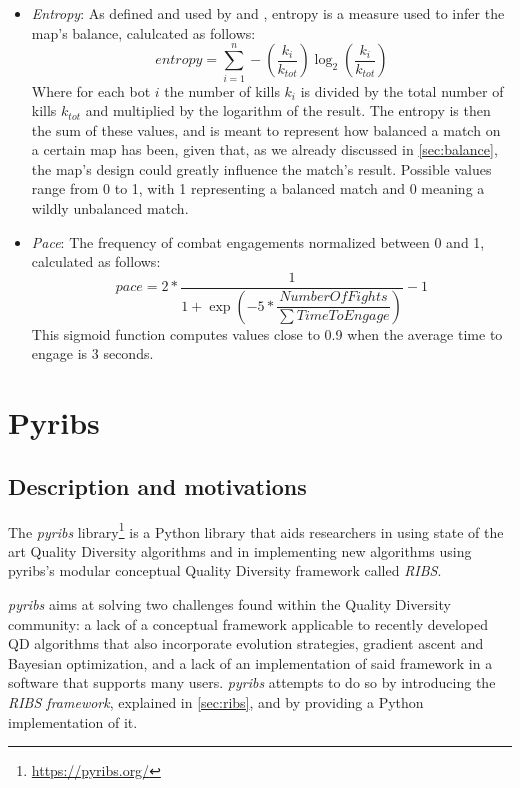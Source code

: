 \documentclass{Configuration_Files/PoliMi3i_thesis}
\begin{document}
\begin{itemize}
    \item \textit{Entropy}: As defined and used by \citet{lanzi_evolving_2014} and \citet{loiacono_fight_2017}, entropy is a measure used to infer the map's balance, calulcated as follows:
    \begin{equation}
        entropy = \sum_{i=1}^{n} - \left(\dfrac{k_i}{k_{tot}}\right) \log_2 \left(\dfrac{k_i}{k_{tot}}\right)
    \end{equation}
    Where for each bot $i$ the number of kills $k_i$ is divided by the total number of kills $k_{tot}$ and multiplied by the logarithm of the result. The entropy is then the sum of these values, and is meant to represent how balanced a match on a certain map has been, given that, as we already discussed in \ref{sec:balance}, the map's design could greatly influence the match's result. Possible values range from 0 to 1, with 1 representing a balanced match and 0 meaning a wildly unbalanced match.
    \item \textit{Pace}: The frequency of combat engagements normalized between 0 and 1, calculated as follows:
    \begin{equation}
        pace = 2 * \dfrac{1}{1 + \exp \left(-5 * \dfrac{NumberOfFights}{\sum TimeToEngage}\right)} - 1
    \end{equation}
    This sigmoid function computes values close to 0.9 when the average time to engage is 3 seconds.

\end{itemize}

\section{Pyribs}
\label{ch:pyribs}
\subsection{Description and motivations}
\label{sec:pyribs_description}
The \textit{pyribs} library\footnote{\url{https://pyribs.org/}} is a Python library that aids researchers in using state of the art Quality Diversity algorithms and in implementing new algorithms using pyribs's modular conceptual Quality Diversity framework called \textit{RIBS}.

\textit{pyribs} aims at solving two challenges found within the Quality Diversity community: a lack of a conceptual framework applicable to  recently developed QD algorithms that also incorporate evolution strategies, gradient ascent and Bayesian optimization, and a lack of an implementation of said framework in a software that supports many users. \textit{pyribs} attempts to do so by introducing the \textit{RIBS framework}, explained in \ref{sec:ribs}, and by providing a Python implementation of it. \cite{tjanaka_pyribs_2023}
\end{document}
